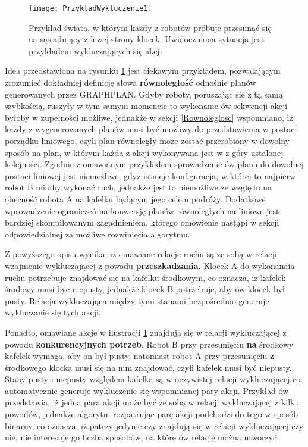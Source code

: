     \begin{figure}[H]
        \texttt{[image: PrzykladWykluczenie1]}
        \centering
        \caption{Przykład świata, w którym każdy z robotów próbuje przesunąć się na sąsiadujący z lewej strony klocek. Uwidoczniona sytuacja 
        jest przykładem wykluczających się akcji}
        \label{PrzykladWykluczenie1}
    \end{figure}

    Idea przedstawiona na rysunku \ref{PrzykladWykluczenie1} jest ciekawym przykładem, pozwalającym zrozumieć dokładniej definicję słowa 
    \textbf{równoległość} odnośnie planów generowanych przez GRAPHPLAN. Gdyby roboty, poruszając się z tą samą szybkością, ruszyły w tym samym momencie
    to wykonanie ów sekwencji akcji byłoby w zupełności możliwe, jednakże w sekcji \ref{Rownoleglosc} wspomniano, iż każdy z wygenerowanych planów 
    musi być możliwy do przedstawienia w postaci porządku liniowego, czyli plan równoległy może zostać przerobiony w dowolny sposób na plan,
    w którym każda z akcji wykonywana jest w z góry ustalonej kolejności.
    Zgodnie z omawianym przykładem sprowadzenie ów planu do dowolnej postaci liniowej jest 
    niemożliwe, gdyż istnieje konfiguracja, w której to najpierw robot B miałby wykonać ruch, jednakże jest to niemożliwe ze względu na 
    obecność robota A na kafelku będącym jego celem podróży. Dodatkowe wprowadzenie ograniczeń na konwersję planów równoległych na liniowe 
    jest bardziej skompilowanym zagadnieniem, którego omówienie nastąpi w sekcji odpowiedzialnej za możliwe rozwinięcia algorytmu.
    
    Z powyższego opisu wynika, iż 
    omawiane relacje ruchu są ze sobą w relacji wzajmenie wykluczającej z powodu \textbf{przeszkadzania}. 
    Klocek A do wykonanaia ruchu potrzebuje znajdować się na kafelku środkowym, co oznacza, iż kafelek środowy musi byc niepusty, 
    jednakże klocek B potrzebuje, aby ów klocek był pusty. Relacja wykluczająca między tymi stanami bezpośrednio generuje wykluczanie się tych akcji.
    
    Ponadto, omawiane akcje w ilustracji \ref{PrzykladWykluczenie1} znajdują się w relacji wykluczającej z powodu \textbf{konkurencyjnych potrzeb}. 
    Robot B przy przesunięciu \textbf{na} środkowy kafelek wymaga, aby on był pusty, natomiast robot A przy przesunięciu \textbf{z} środkowego klocka 
    musi się na nim znajdować, czyli kafelek musi być niepusty. Stany pusty i niepusty względem kafelka są w oczywistej relacji wykluczającej 
    co automatycznie generuje wykluczenie się wspomnianej pary akcji. Przykład ów przedstawia, iż jedna para akcji może być ze sobą w relacji wykluczającej 
    z kilku powodów, jednakże algorytm rozpatrując parę akcji podchodzi do tego w sposób binarny, co oznacza, iż patrzy jedynie czy znajdują się w 
    relacji wykluczającej czy nie, nie interesuje go liczba sposobów, na które ów relację można utworzyć.    

